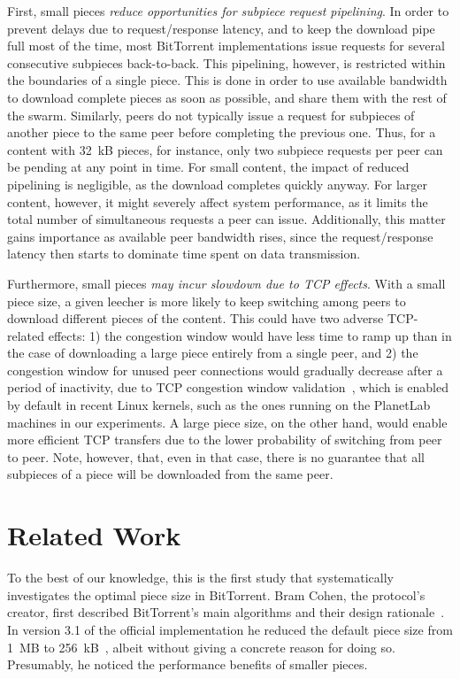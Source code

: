 \documentclass[twocolumn,letterpaper,11pt]{article}
\begin{document}
First, small pieces \emph{reduce opportunities for subpiece request pipelining}.
In order to prevent delays due to request/response latency, and to keep the download
pipe full most of the time, most BitTorrent implementations
issue requests for several consecutive subpieces back-to-back. This 
pipelining, however, is restricted within the boundaries of a single piece.
This is done in order to use available bandwidth to download complete pieces as soon 
as possible, and share them
with the rest of the swarm. Similarly, peers do not typically issue a request for 
subpieces of another piece 
to the same peer before completing the previous one.
Thus, for a content with 32~kB pieces, for instance, only two subpiece requests per peer 
can be pending at any point in time.
For small content, the impact of reduced pipelining is negligible,
as the download completes quickly anyway.
For larger content, however, it might severely affect system performance, as it
limits the total number of simultaneous requests a peer can issue.
Additionally, this matter
gains importance as available peer bandwidth rises, since the request/response
latency then starts to dominate time spent on data transmission.

Furthermore, small pieces \emph{may incur slowdown due to TCP effects}. With a small piece size, a given 
leecher is more likely to keep switching among peers to download different pieces of the content.
This could have two adverse TCP-related effects: 1) the congestion window would have less time 
to ramp up than
in the case of downloading a large piece entirely from a single peer, and 2) the congestion 
window for unused peer connections would gradually decrease after a period 
of inactivity, due to TCP congestion window validation~\cite{rfc2861}, which
is enabled by default in recent Linux kernels, such as the ones running on the PlanetLab 
machines in our experiments.
A large piece size, on the other hand, would enable more efficient TCP transfers due to 
the lower probability 
of switching from peer to peer. Note, however, that, even in that case, there is no guarantee
that all subpieces of a piece will be downloaded from the same peer.

\section{Related Work}
\label{sec:related}

To the best of our knowledge, this is the first study that systematically investigates
the optimal piece size in BitTorrent.
Bram Cohen, the protocol's creator, first described BitTorrent's main 
algorithms and their design rationale~\cite{cohen03}. 
In version 3.1 of the official implementation he reduced the default piece size from 
1~MB to 256~kB~\cite{piecechange}, albeit without giving a concrete reason for 
doing so. Presumably, he noticed the performance benefits of smaller pieces.
\end{document}
